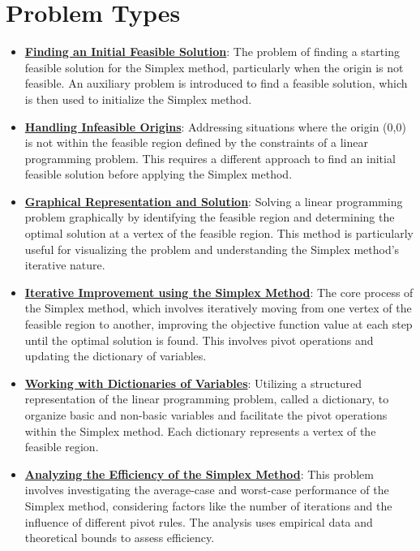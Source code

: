 \documentclass{article}%
\begin{document}
%
\section{Problem Types}%
\label{sec:ProblemTypes}%
\begin{itemize}[leftmargin=*]%
\item \href{https://www.math.purdue.edu/~yipn/421/2024-08-27-ExSimplex.pdf#page=32}{\textbf{Finding an Initial Feasible Solution}}: The problem of finding a starting feasible solution for the Simplex method, particularly when the origin is not feasible. An auxiliary problem is introduced to find a feasible solution, which is then used to initialize the Simplex method. %
\item \href{https://www.math.purdue.edu/~yipn/421/2024-08-27-ExSimplex.pdf#page=30}{\textbf{Handling Infeasible Origins}}: Addressing situations where the origin (0,0) is not within the feasible region defined by the constraints of a linear programming problem. This requires a different approach to find an initial feasible solution before applying the Simplex method. %
\item \href{https://www.math.purdue.edu/~yipn/421/2024-08-27-ExSimplex.pdf#page=2}{\textbf{Graphical Representation and Solution}}: Solving a linear programming problem graphically by identifying the feasible region and determining the optimal solution at a vertex of the feasible region. This method is particularly useful for visualizing the problem and understanding the Simplex method's iterative nature. %
\item \href{https://www.math.purdue.edu/~yipn/421/2024-08-27-ExSimplex.pdf#page=6}{\textbf{Iterative Improvement using the Simplex Method}}: The core process of the Simplex method, which involves iteratively moving from one vertex of the feasible region to another, improving the objective function value at each step until the optimal solution is found. This involves pivot operations and updating the dictionary of variables. %
\item \href{https://www.math.purdue.edu/~yipn/421/2024-08-27-ExSimplex.pdf#page=26}{\textbf{Working with Dictionaries of Variables}}: Utilizing a structured representation of the linear programming problem, called a dictionary, to organize basic and non-basic variables and facilitate the pivot operations within the Simplex method. Each dictionary represents a vertex of the feasible region. %
\item \href{https://www.math.purdue.edu/~yipn/421/2024-09-05-SimplexEfficiency.pdf#page=1}{\textbf{Analyzing the Efficiency of the Simplex Method}}: This problem involves investigating the average-case and worst-case performance of the Simplex method, considering factors like the number of iterations and the influence of different pivot rules. The analysis uses empirical data and theoretical bounds to assess efficiency. %

\end{itemize}
\end{document}
